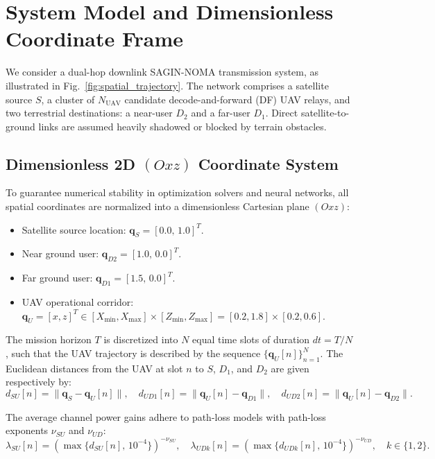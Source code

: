 \section{System Model and Dimensionless Coordinate Frame}
\label{sec:sys_model}

We consider a dual-hop downlink SAGIN-NOMA transmission system, as illustrated in Fig.~\ref{fig:spatial_trajectory}. The network comprises a satellite source $S$, a cluster of $N_{\text{UAV}}$ candidate decode-and-forward (DF) UAV relays, and two terrestrial destinations: a near-user $D_2$ and a far-user $D_1$. Direct satellite-to-ground links are assumed heavily shadowed or blocked by terrain obstacles.

\subsection{Dimensionless 2D $(Oxz)$ Coordinate System}
To guarantee numerical stability in optimization solvers and neural networks, all spatial coordinates are normalized into a dimensionless Cartesian plane $(Oxz)$:
\begin{itemize}
    \item Satellite source location: $\mathbf{q}_S = [0.0, \, 1.0]^T$.
    \item Near ground user: $\mathbf{q}_{D2} = [1.0, \, 0.0]^T$.
    \item Far ground user: $\mathbf{q}_{D1} = [1.5, \, 0.0]^T$.
    \item UAV operational corridor: $\mathbf{q}_U = [x, z]^T \in [X_{\min}, X_{\max}] \times [Z_{\min}, Z_{\max}] = [0.2, 1.8] \times [0.2, 0.6]$.
\end{itemize}

The mission horizon $T$ is discretized into $N$ equal time slots of duration $dt = T/N$, such that the UAV trajectory is described by the sequence $\{\mathbf{q}_U[n]\}_{n=1}^N$. The Euclidean distances from the UAV at slot $n$ to $S$, $D_1$, and $D_2$ are given respectively by:
\begin{equation}
    d_{SU}[n] = \|\mathbf{q}_S - \mathbf{q}_U[n]\|, \quad d_{UD1}[n] = \|\mathbf{q}_U[n] - \mathbf{q}_{D1}\|, \quad d_{UD2}[n] = \|\mathbf{q}_U[n] - \mathbf{q}_{D2}\|.
\end{equation}

The average channel power gains adhere to path-loss models with path-loss exponents $\nu_{SU}$ and $\nu_{UD}$:
\begin{equation}
    \lambda_{SU}[n] = \left( \max\{d_{SU}[n], \, 10^{-4}\} \right)^{-\nu_{SU}}, \quad \lambda_{UDk}[n] = \left( \max\{d_{UDk}[n], \, 10^{-4}\} \right)^{-\nu_{UD}}, \quad k \in \{1, 2\}.
\end{equation}

